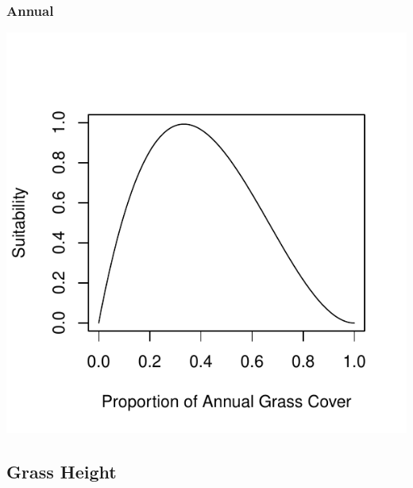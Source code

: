 \documentclass[12pt,letterpaper]{article}\usepackage{graphicx, color}
\makeatletter
\def\maxwidth{ %
  \ifdim\Gin@nat@width>\linewidth
    \linewidth
  \else
    \Gin@nat@width
  \fi
}
\newenvironment{knitrout}{}{} %
\makeatother
\begin{document}
\subsubsection{Annual}
\begin{knitrout}
\color{fgcolor}\includegraphics[width=\maxwidth]{figure/Sally-Dan_Grass_Cover_a} 
\end{knitrout}

\subsection{Grass Height}
\end{document}
